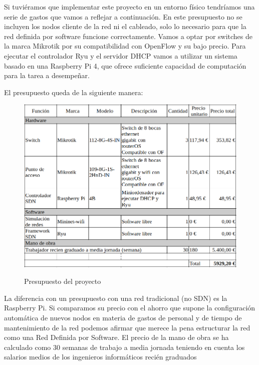 Si tuviéramos que implementar este proyecto en un entorno físico tendríamos una serie de gastos que vamos a reflejar a continuación. En este presupuesto no se incluyen los nodos cliente de la red ni el cableado, solo lo necesario para que la red definida por software funcione correctamente. Vamos a optar por switches de la marca Mikrotik por su compatibilidad con OpenFlow y su bajo precio. Para ejecutar el controlador Ryu y el servidor DHCP vamos a utilizar un sistema basado en una Raspberry Pi 4, que ofrece suficiente capacidad de computación para la tarea a desempeñar.

El presupuesto queda de la siguiente manera:

\begin{figure}[!h]
\centering
\includegraphics[width=\textwidth]{imagenes/figuras/presupuesto.png}
\label{tab:presupuesto}
\caption{Presupuesto del proyecto}
\end{figure}

La diferencia con un presupuesto con una red tradicional (no SDN) es la Raspberry Pi. Si comparamos su precio con el ahorro que supone la configuración automática de nuevos nodos en materia de gastos de personal y de tiempo de mantenimiento de la red podemos afirmar que merece la pena estructurar la red como una Red Definida por Software. El precio de la mano de obra se ha calculado como 30 semanas de trabajo a media jornada teniendo en cuenta los salarios medios de los ingenieros informáticos recién graduados \cite{Cuantoco58:online}